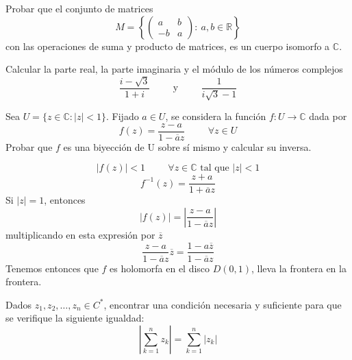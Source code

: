 \begin{ejer}
	Probar que el conjunto de matrices
	$$ M = \left\{ 
	\left( \begin{array}{cc}
	 a & b \\
	-b & a \end{array} \right)
	: \ a, b\in \mathbb{R}\right\} $$
	con las operaciones de suma y producto de matrices, es un cuerpo isomorfo a $\mathbb{C}$.
\end{ejer}


\begin{ejer}
	Calcular la parte real, la parte imaginaria y el módulo de los números complejos
	$$ \frac{i-\sqrt{3}}{1+i}\hspace{1cm}\text{y}\hspace{1cm} \frac{1}{i\sqrt{3}-1} $$
\end{ejer}



\begin{ejer}
	Sea $U=\{ z\in\mathbb{C} : |z|<1 \}$.
	Fijado $a \in U$, se considera la función $f: U\rightarrow\mathbb{C}$ dada por
	$$ f(z) = \frac{z-a}{1-\overline{a}z}\hspace{1cm} \forall z\in U $$
	Probar que $f$ es una biyección de U sobre sí mismo y calcular su inversa.
\end{ejer}

\begin{sol}

$$|f(z)| < 1 \hspace{1cm} \forall z\in\mathbb{C} \text{ tal que } |z| <1$$
$$f^{-1}(z)= \frac{z+a}{1+\overline{a}z}$$
Si $|z|=1$, entonces $$|f(z)| = 			
	\left|\frac{z-a}{1-\overline{a}z}\right|$$
multiplicando en esta expresión por $\overline{z}$
$$ \frac{z-a}{1-\overline{a}z} \overline{z}  =  \frac{1-a\overline{z}}{1-\overline{a}z}$$
Tenemos entonces que $f$ es holomorfa en el disco $D(0,1)$, lleva la frontera en la frontera.
\end{sol}


\begin{ejer}
	Dados $z_1, z_2, \ldots , z_n \in C^{\ast}$, encontrar una condición necesaria y suficiente para que se verifique la siguiente igualdad:
	$$ \left|\sum_{k=1}^n z_k\right| = \sum_{k=1}^n |z_k|$$
\end{ejer}


